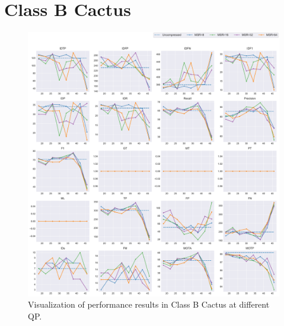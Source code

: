 
\section{Class B Cactus}
\label{sec:appendix/Cactus_all}


\begin{figure}[!htbp]
\centering
\includegraphics[width=1.0\linewidth]{img/appendix/Cactus_all_multiplots_qp.pdf}
\caption[Visualization of performance results in Class B Cactus at different QP]
{Visualization of performance results in Class B Cactus at different QP.}
\label{fig:Cactus_all_qp}
\end{figure}

